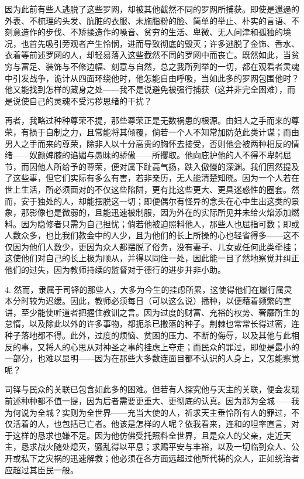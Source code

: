 因为此前有些人逃脱了这些罗网，却被其他截然不同的罗网所捕获。即使是邋遢的外表、不梳理的头发、肮脏的衣服、未施脂粉的脸、简单的举止、朴实的言语、不刻意造作的步伐、不矫揉造作的嗓音、贫穷的生活、卑微、无人问津和孤独的境况，也首先吸引旁观者产生怜悯，进而导致彻底的毁灭；许多逃脱了金饰、香水、衣着等前述罗网的人，却轻易落入这些截然不同的罗网中而丧亡。既然如此，当贫穷与富足、装饰与不修边幅、刻意与自然，总之我所列举的一切，都在观看者灵魂中引发战争，诡计从四面环绕他时，他怎能自由呼吸，当如此多的罗网包围他时？他又能找到怎样的藏身之处——我不是说避免被强行捕获（这并非完全困难），而是说使自己的灵魂不受污秽思绪的干扰？\par

再者，我略过种种尊荣不提，那些尊荣正是无数祸患的根源。由妇人之手而来的尊荣，有损于自制之力，且常能将其倾覆，倘若一个人不知常加防范此类计谋；而由男人之手而来的尊荣，除非人以十分高贵的胸怀去接受，否则他会被两种相反的情绪——奴颜婢膝的谄媚与愚昧的骄傲——所攫取。他向庇护他的人不得不卑躬屈节，而因他人所给予的尊荣，便对属下趾高气扬，跌入傲慢的深渊。我们固然提及了这些事，但它们实际有多么有害，若非亲历，无人能清楚知晓。因为一个人若在世上生活，所必须面对的不仅这些陷阱，更有比这些更大、更具迷惑性的圈套。然而，安于独处的人，却能摆脱这一切；即便偶尔有怪异的念头在心中生出这类的景象，那影像也是微弱的，且能迅速被制服，因为外在的实际所见并未给火焰添加燃料。因为隐修者只需为自己担忧；倘若他被迫照料他人，那些人也屈指可数；即或人数众多，也比我们教会中的人少，且为他们的长上所操的心也轻省得多——这不仅因为他们人数少，更因为众人都摆脱了俗务，没有妻子、儿女或任何此类牵挂；这使他们对自己的长上极为顺从，并得以同住一处，因此能一目了然地察觉并纠正他们的过失，因为教师持续的监督对于德行的进步并非小助。\par

4. 然而，隶属于司铎的那些人，大多为今生的挂虑所累，这使得他们在履行属灵本分时较为迟缓。因此，教师必须每日（可以这么说）播种，以便藉着频繁的宣讲，至少能使听道者把握住教训之言。因为过度的财富、充裕的权势、奢靡所生的怠惰，以及除此以外的许多事物，都扼杀已撒落的种子。荆棘也常常长得过密，连种子落地都不得。此外，过度的烦恼、贫困的压力、不断的侮辱，以及其他与此相反的事，又将人的心思从对神圣之事的挂虑上夺走；而民众的罪过，即便是最小的一部分，也难以显明——因为在那些大多数连面目都不认识的人身上，又怎能察觉呢？\par

司铎与民众的关联已包含如此多的困难。但若有人探究他与天主的关联，便会发现前述种种都不值一提，因为后者需要更重大、更彻底的认真。因为那为全城——我为何说为全城？实则为全世界——充当大使的人，祈求天主垂怜所有人的罪过，不仅活着的人，也包括已亡者。他该是怎样的人呢？依我看来，连和的坦率直言，对于这样的恳求也嫌不足。因为他仿佛受托照料全世界，且是众人的父亲，走近天主，恳求战火随处熄灭，骚乱得以平息；求赐平安与丰裕，以及一切临到众人、公开或私下之灾祸的迅速解救；他必须在各方面远超过他所代祷的众人，正如统治者应超过其臣民一般。\par

